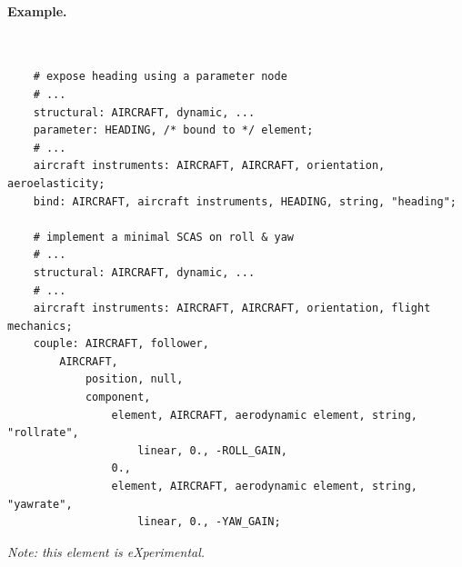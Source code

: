 \paragraph{Example.} \
\begin{verbatim}
    # expose heading using a parameter node
    # ...
    structural: AIRCRAFT, dynamic, ...
    parameter: HEADING, /* bound to */ element;
    # ...
    aircraft instruments: AIRCRAFT, AIRCRAFT, orientation, aeroelasticity;
    bind: AIRCRAFT, aircraft instruments, HEADING, string, "heading";

    # implement a minimal SCAS on roll & yaw
    # ...
    structural: AIRCRAFT, dynamic, ...
    # ...
    aircraft instruments: AIRCRAFT, AIRCRAFT, orientation, flight mechanics;
    couple: AIRCRAFT, follower,
        AIRCRAFT,
            position, null,
            component,
                element, AIRCRAFT, aerodynamic element, string, "rollrate",
                    linear, 0., -ROLL_GAIN,
                0.,
                element, AIRCRAFT, aerodynamic element, string, "yawrate",
                    linear, 0., -YAW_GAIN;
\end{verbatim}


\noindent
\emph{Note: this element is eXperimental.}





